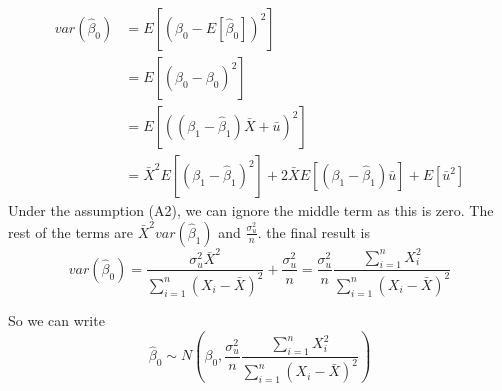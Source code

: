 \begin{itemize}
\begin{itemize}
\[\begin{aligned}
var(\hat{\beta}_0)&=E\left[\left(\hat{\beta}_0-E[\hat{\beta}_0]\right)^2\right] \\
&=E\left[\left(\hat{\beta}_0-{\beta}_0\right)^2\right]\\
&=E\left[\left( (\beta_1-\hat{\beta}_1)\bar{X}+\bar{u}\right)^2\right]\\
&=\bar{X}^2E\left[\left(\beta_1-\hat{\beta}_1 \right)^2\right]+ 2\bar{X}E\left[\left(\beta_1-\hat{\beta}_1 \right)\bar{u}\right] + E[\bar{u}^2]
\end{aligned}
\]
Under the assumption (A2), we can ignore the middle term as this is zero. The rest of the terms are $\bar{X}^2 var(\hat{\beta}_1)$ and $\frac{\sigma_u^2}{n}$. the final result is
\[
var(\hat{\beta}_0)=\frac{\sigma_u^2\bar{X}^2}{\sum_{i=1}^n(X_i-\bar{X})^2}+\frac{\sigma_u^2}{n}= \frac{\sigma_u^2}{n}\frac{\sum_{i=1}^nX_i^2}{\sum_{i=1}^n(X_i-\bar{X})^2}
\]
\end{itemize}
So we can write 
\[
\hat{\beta}_0 \sim N\left(\beta_0, \frac{\sigma_u^2}{n}\frac{\sum_{i=1}^nX_i^2}{\sum_{i=1}^n(X_i-\bar{X})^2}\right)
\]
\end{itemize}

